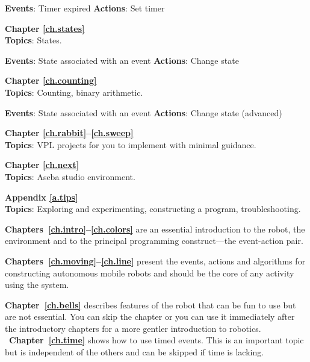 \textbf{Events}: Timer expired \hfill \textbf{Actions}: Set timer

 \hfill {}

\bigskip

{\centering \textbf{Chapter \ref{ch.states}}\\}
\textbf{Topics}: States.

\textbf{Events}: State associated with an event \hfill \textbf{Actions}: Change state

 \hfill {}

\bigskip

{\centering \textbf{Chapter \ref{ch.counting}}\\}
\textbf{Topics}: Counting, binary arithmetic.

\textbf{Events}: State associated with an event  \hfill \textbf{Actions}: Change state (advanced)

 \hfill {}

\bigskip

{\centering \textbf{Chapter \ref{ch.rabbit}--\ref{ch.sweep}}\\}
\textbf{Topics}: VPL projects for you to implement with minimal
 guidance.

\bigskip

{\centering \textbf{Chapter \ref{ch.next}}\\}
\textbf{Topics}: Aseba studio environment.

\bigskip

{\centering \textbf{Appendix \ref{a.tips}}\\}
\textbf{Topics}: Exploring and experimenting,
constructing a program, troubleshooting.



\textbf{Chapters~\ref{ch.intro}--\ref{ch.colors}} are an essential introduction
to the robot, the environment and to the principal programming construct---the
event-action pair.

\textbf{Chapters~\ref{ch.moving}--\ref{ch.line}} present the events, actions and algorithms
for constructing autonomous mobile robots and should be the core of any
activity using the system.

\textbf{Chapter~\ref{ch.bells}} describes features of the robot that can
be fun to use but are not essential. You can skip the chapter or you can 
use it immediately after the introductory chapters
for a more gentler introduction to robotics.
\
\textbf{Chapter~\ref{ch.time}} shows how to use timed events.
This is an important topic but is independent of the others
and can be skipped if time is lacking.

